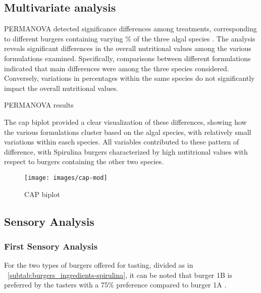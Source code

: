 \subsection{Multivariate analysis}
PERMANOVA detected significance differences among treatments, corresponding to different burgers containing varying \zxriv{}\% of the three algal species . The analysis reveals significant differences in the overall nutritional values among the various formulations examined. Specifically, comparisons between different formulations indicated that main differences were among the three species considered. Conversely, variations in percentages within the same species do not significantly impact the overall nutritional values.
\begin{table}[H]
	\centering
	\small
	
	\caption{PERMANOVA results}
	\label{tab:permanova}
\end{table}

The \gls{cap} biplot  provided a clear visualization of these differences, showing how the various formulations cluster based on the algal species, with relatively small variations within easch species. All variables contributed to these pattern of difference, with Spirulina burgers characterized by high nutitrional values with respect to burgers containing the other two species.

\begin{figure}[H]
\centering
\texttt{[image: images/cap-mod]}
\caption{CAP biplot}
\label{fig:cap_biplot}
\end{figure}

\subsection{Sensory Analysis}
\subsubsection{First Sensory Analysis}

For the two types of  burgers offered for tasting, divided as in \tab{}~\ref{subtab:burgers_ingredients-spirulina}, it can be noted that burger 1B is preferred by the tasters with a \num{75}\% preference compared to burger 1A .

